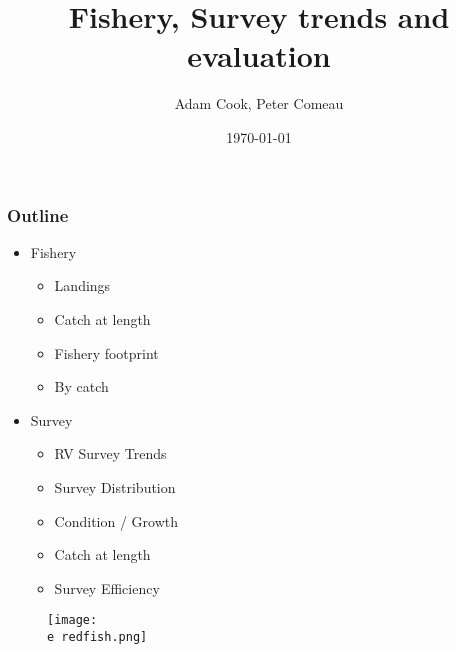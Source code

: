 \documentclass{beamer}
\title[Unit III Redfish]{Fishery, Survey trends and evaluation }
\author{Adam Cook, Peter Comeau} %
\institute[Population Ecology Division] 
{
Bedford Institute of Oceanography \\ %
\medskip
\textit{Adam.Cook@dfo-mpo.gc.ca} %
}
\date{\today} %
\begin{document}
\begin{frame}
\titlepage %
\end{frame}
\newcommand{\D}{.}
\newcommand{\e}{/home/ecomod_data/redfish/figures/}



\begin{frame}
\frametitle{Outline}
\begin{block}

\begin{itemize}

\item Fishery
	\begin{itemize}
	\item Landings
	\item Catch at length
	\item Fishery footprint
	\item By catch
	\end{itemize}

\item Survey
	\begin{itemize}
		\item RV Survey Trends
		\item Survey Distribution
		\item Condition / Growth
		\item Catch at length
		\item Survey Efficiency
	\end{itemize}

				\end{itemize}
				\end{block}
				\begin{figure}
				\vspace*{-.75cm}
				 \hspace*{5cm} \centerline{\texttt{[image: \\e redfish.png]}} 
				 \vspace*{-1.5cm}
				 \end{figure}

\end{frame}
\end{document}
